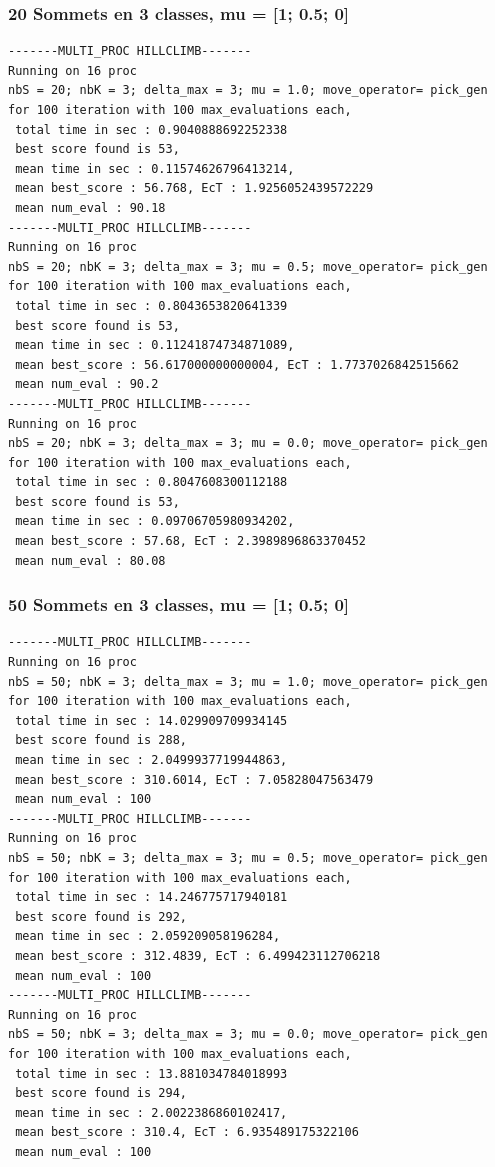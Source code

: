 \documentclass[a4paper]{article}
\begin{document}
\subsubsection{20 Sommets en 3 classes, mu = [1; 0.5; 0]}
\begin{verbatim}
-------MULTI_PROC HILLCLIMB-------
Running on 16 proc
nbS = 20; nbK = 3; delta_max = 3; mu = 1.0; move_operator= pick_gen
for 100 iteration with 100 max_evaluations each, 
 total time in sec : 0.9040888692252338
 best score found is 53,
 mean time in sec : 0.11574626796413214,
 mean best_score : 56.768, EcT : 1.9256052439572229
 mean num_eval : 90.18
-------MULTI_PROC HILLCLIMB-------
Running on 16 proc
nbS = 20; nbK = 3; delta_max = 3; mu = 0.5; move_operator= pick_gen
for 100 iteration with 100 max_evaluations each, 
 total time in sec : 0.8043653820641339
 best score found is 53,
 mean time in sec : 0.11241874734871089,
 mean best_score : 56.617000000000004, EcT : 1.7737026842515662
 mean num_eval : 90.2
-------MULTI_PROC HILLCLIMB-------
Running on 16 proc
nbS = 20; nbK = 3; delta_max = 3; mu = 0.0; move_operator= pick_gen
for 100 iteration with 100 max_evaluations each, 
 total time in sec : 0.8047608300112188
 best score found is 53,
 mean time in sec : 0.09706705980934202,
 mean best_score : 57.68, EcT : 2.3989896863370452
 mean num_eval : 80.08
\end{verbatim}
\subsubsection{50 Sommets en 3 classes, mu = [1; 0.5; 0]}
\begin{verbatim}
-------MULTI_PROC HILLCLIMB-------
Running on 16 proc
nbS = 50; nbK = 3; delta_max = 3; mu = 1.0; move_operator= pick_gen
for 100 iteration with 100 max_evaluations each, 
 total time in sec : 14.029909709934145
 best score found is 288,
 mean time in sec : 2.0499937719944863,
 mean best_score : 310.6014, EcT : 7.05828047563479
 mean num_eval : 100
-------MULTI_PROC HILLCLIMB-------
Running on 16 proc
nbS = 50; nbK = 3; delta_max = 3; mu = 0.5; move_operator= pick_gen
for 100 iteration with 100 max_evaluations each, 
 total time in sec : 14.246775717940181
 best score found is 292,
 mean time in sec : 2.059209058196284,
 mean best_score : 312.4839, EcT : 6.499423112706218
 mean num_eval : 100
-------MULTI_PROC HILLCLIMB-------
Running on 16 proc
nbS = 50; nbK = 3; delta_max = 3; mu = 0.0; move_operator= pick_gen
for 100 iteration with 100 max_evaluations each, 
 total time in sec : 13.881034784018993
 best score found is 294,
 mean time in sec : 2.0022386860102417,
 mean best_score : 310.4, EcT : 6.935489175322106
 mean num_eval : 100
\end{verbatim}
\end{document}
